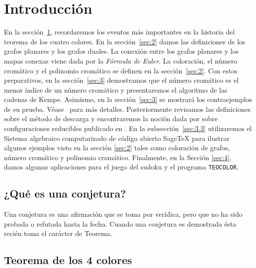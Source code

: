 \documentclass[3p,times,a4paper,twocolumn,authoryear]{elsarticle} %
\begin{document}
\tableofcontents

\section{Introducción}\label{sec:1}

En la sección~\ref{sec:1}, recordaremos los eventos más importantes en la historia del teorema de los cuatro colores. En la sección~\ref{sec:2} damos las definiciones de los grafos planares y los grafos duales. La conexión entre los grafos planares y los mapas conexas viene dada por la \emph{Fórmula de Euler}. La coloración, el número cromático y el polinomio cromático se definen en la sección~\ref{sec:2}. Con estos preparativos, en la sección~\ref{sec:3} demostramos que el número cromático es el menor índice de un número cromático y presentaremos el algoritmo de las cadenas de Kempe. Asimismo, en la sección~\ref{sec:3} se mostrará los contraejemplos de su prueba. Véase~\cite{errera} para más detalles. Posteriormente revisamos las definiciones sobre el método de descarga y encontraremos la noción dada por \citeauthor{birkhoff} sobre configuraciones reducibles publicado en \cite{birkhoff}. En la subsección~\ref{sec:3.3} utilizaremos el Sistema algebraico computarizado de código abierto Sage\TeX{} para ilustrar algunos ejemplos visto en la sección \ref{sec:2} tales como coloración de grafos, número cromático y polinomio cromático. Finalmente, en la Sección \ref{sec:4}, damos algunas aplicaciones para el juego del sudoku y el programa \texttt{TEOCOLOR}.


\subsection{¿Qué es una conjetura?}\label{sec:1.1}
Una conjetura es una afirmación que se toma por verídica, pero que no ha sido probada o refutada hasta la fecha. Cuando una conjetura es demostrada ésta recién toma el carácter de Teorema.

\subsection{Teorema de  los 4 colores}\label{sec:1.2}
\end{document}
